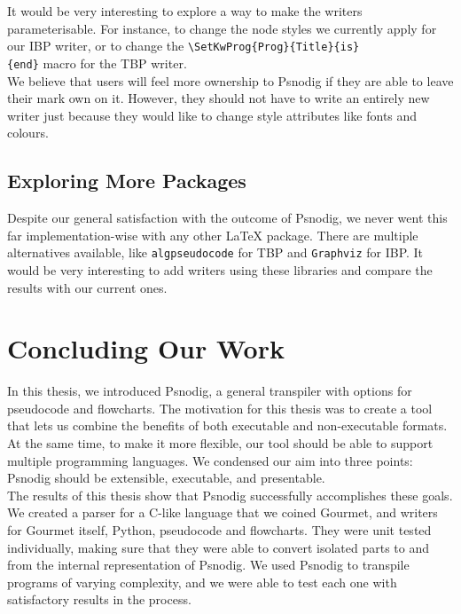 It would be very interesting to explore a way to make the writers parameterisable. For instance, to change the node styles we currently apply for our IBP writer, or to change the \texttt{\textbackslash SetKwProg\{Prog\}\{Title\}\{is\}\\\{end\}} macro for the TBP writer. \\

We believe that users will feel more ownership to Psnodig if they are able to leave their mark own on it. However, they should not have to write an entirely new writer just because they would like to change style attributes like fonts and colours.

\subsection{Exploring More Packages}

Despite our general satisfaction with the outcome of Psnodig, we never went this far implementation-wise with any other LaTeX package. There are multiple alternatives available, like \texttt{algpseudocode} for TBP and \texttt{Graphviz} for IBP. It would be very interesting to add writers using these libraries and compare the results with our current ones. \\

\section{Concluding Our Work}

In this thesis, we introduced Psnodig, a general transpiler with options for pseudocode and flowcharts. The motivation for this thesis was to create a tool that lets us combine the benefits of both executable and non-executable formats. At the same time, to make it more flexible, our tool should be able to support multiple programming languages. We condensed our aim into three points: Psnodig should be extensible, executable, and presentable. \\

The results of this thesis show that Psnodig successfully accomplishes these goals. We created a parser for a C-like language that we coined Gourmet, and writers for Gourmet itself, Python, pseudocode and flowcharts. They were unit tested individually, making sure that they were able to convert isolated parts to and from the internal representation of Psnodig. We used Psnodig to transpile programs of varying complexity, and we were able to test each one with satisfactory results in the process. \\

